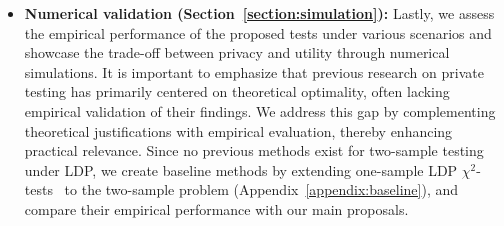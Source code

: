 \documentclass[twoside,11pt]{article}
\begin{document}
\begin{itemize}
	\item \textbf{Numerical validation (Section~\ref{section:simulation}):}
	Lastly, we assess the empirical performance of the proposed tests under various scenarios and showcase the trade-off between privacy and utility through numerical simulations. It is important to emphasize that previous research on private testing has primarily centered on theoretical optimality, often lacking empirical validation of their findings. We address this gap by complementing theoretical justifications with empirical evaluation, thereby enhancing practical relevance. Since no previous methods exist for two-sample testing under LDP, we create baseline methods by extending one-sample LDP $\chi^2$-tests~\citep{Gaboardi2018LDPChisq} to the two-sample problem (Appendix~\ref{appendix:baseline}), and compare their empirical performance with our main proposals.
\end{itemize}
\end{document}
